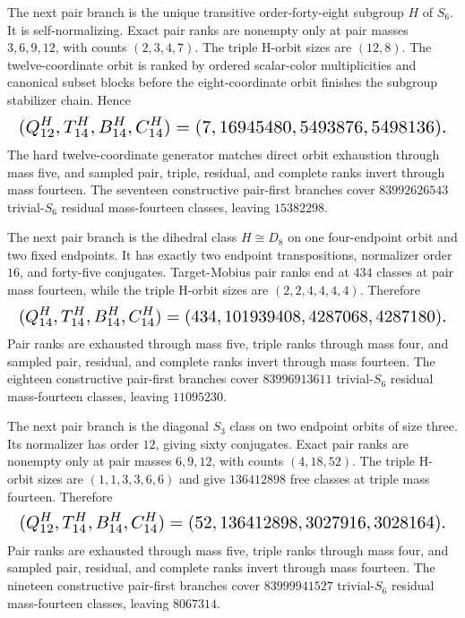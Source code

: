 \documentclass{article}
\newcommand{\fitmath}[1]{\resizebox{0.99\linewidth}{!}{$\displaystyle #1$}}
\begin{document}
The next pair branch is the unique transitive order-forty-eight subgroup $H$ of
$S_6$. It is self-normalizing. Exact pair ranks are nonempty only at pair masses
$3,6,9,12$, with counts $(2,3,4,7)$. The triple H-orbit sizes are $(12,8)$.
The twelve-coordinate orbit is ranked by ordered scalar-color multiplicities and
canonical subset blocks before the eight-coordinate orbit finishes the subgroup
stabilizer chain. Hence
\begin{equation}
  \fitmath{%
    (Q^H_{12},T^H_{14},B^H_{14},C^H_{14})
      =(7,16945480,5493876,5498136).
  }
  \label{eq:optimization-crazy-sextuple-s6-pair-transitive-order48-ranking}
\end{equation}
The hard twelve-coordinate generator matches direct orbit exhaustion through
mass five, and sampled pair, triple, residual, and complete ranks invert through
mass fourteen. The seventeen constructive pair-first branches cover
$83992626543$ trivial-$S_6$ residual mass-fourteen classes, leaving $15382298$.

The next pair branch is the dihedral class $H\cong D_8$ on one four-endpoint
orbit and two fixed endpoints. It has exactly two endpoint transpositions,
normalizer order $16$, and forty-five conjugates. Target-Mobius pair ranks end
at $434$ classes at pair mass fourteen, while the triple H-orbit sizes are
$(2,2,4,4,4,4)$. Therefore
\begin{equation}
  \fitmath{%
    (Q^H_{14},T^H_{14},B^H_{14},C^H_{14})
      =(434,101939408,4287068,4287180).
  }
  \label{eq:optimization-crazy-sextuple-s6-pair-d8-411-ranking}
\end{equation}
Pair ranks are exhausted through mass five, triple ranks through mass four, and
sampled pair, residual, and complete ranks invert through mass fourteen. The
eighteen constructive pair-first branches cover $83996913611$ trivial-$S_6$
residual mass-fourteen classes, leaving $11095230$.

The next pair branch is the diagonal $S_3$ class on two endpoint orbits of size
three. Its normalizer has order $12$, giving sixty conjugates. Exact pair ranks
are nonempty only at pair masses $6,9,12$, with counts $(4,18,52)$. The triple
H-orbit sizes are $(1,1,3,3,6,6)$ and give $136412898$ free classes at triple
mass fourteen. Therefore
\begin{equation}
  \fitmath{%
    (Q^H_{12},T^H_{14},B^H_{14},C^H_{14})
      =(52,136412898,3027916,3028164).
  }
  \label{eq:optimization-crazy-sextuple-s6-pair-diagonal-s3-33-ranking}
\end{equation}
Pair ranks are exhausted through mass five, triple ranks through mass four, and
sampled pair, residual, and complete ranks invert through mass fourteen. The
nineteen constructive pair-first branches cover $83999941527$ trivial-$S_6$
residual mass-fourteen classes, leaving $8067314$.
\end{document}

